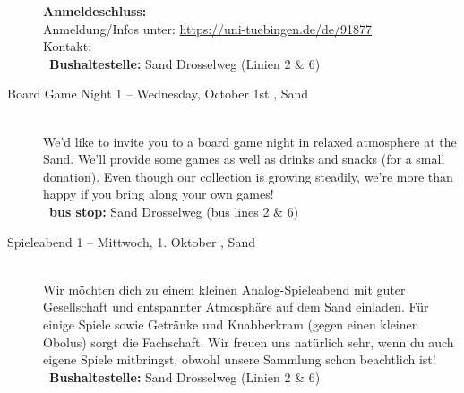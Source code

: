 \begin{description}
    \textbf{Anmeldeschluss:} \matheanmeldung\YEAR\\
    Anmeldung/Infos unter: \url{https://uni-tuebingen.de/de/91877}\\
    Kontakt: \texttt{\mathkontakt}
    \ifsommersemester
        \\ ~\textbf{Bushaltestelle:} Sand Drosselweg (Linien 2 \& 6)
    \fi
\fi


\ifml
    \item[Board Game Night 1 -- Wednesday, October 1st \YEAR, Sand]~\\%
    We'd like to invite you to a board game night in relaxed atmosphere at the Sand.
    We'll provide some games as well as drinks and snacks (for a small donation).
    Even though our collection is growing steadily, we're more than happy if you bring along your own games!\\
    ~\textbf{bus stop:} Sand Drosselweg (bus lines 2 \& 6)
\else
    \item[Spieleabend 1 -- Mittwoch, 1. Oktober \YEAR, Sand]~\\%
    Wir möchten dich zu einem kleinen Analog-Spieleabend mit guter Gesellschaft und entspannter Atmosphäre auf dem Sand einladen.
    Für einige Spiele sowie Getränke und Knabberkram (gegen einen kleinen Obolus) sorgt die Fachschaft.
    Wir freuen uns natürlich sehr, wenn du auch eigene Spiele mitbringst, obwohl unsere Sammlung schon beachtlich ist!\\
    ~\textbf{Bushaltestelle:} Sand Drosselweg (Linien 2 \& 6)
\fi





\ifmaster \ifinfo \iflehramt \else \pagebreak \fi \fi \fi
\ifmaster \ifmedien \pagebreak \fi \fi
\ifmaster \ifmedinfo \pagebreak \fi \fi
\ifmaster \ifkogwiss \pagebreak \fi \fi


\end{description}

